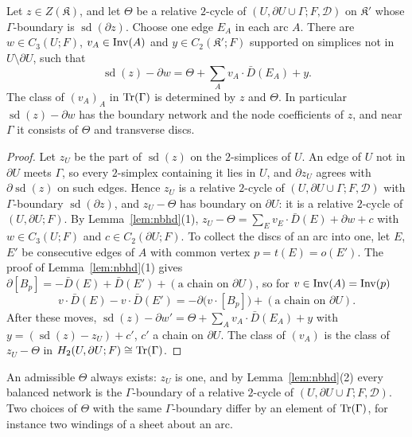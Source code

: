 \begin{lemma}\label{lem:normalform}
Let $z\in Z(\mathfrak K)$, and let $\Theta$ be a relative $2$-cycle of $(U,\partial U\cup\Gamma;F,\mathcal D)$ on $\mathfrak K'$
whose $\Gamma$-boundary is $\operatorname{sd}(\partial z)$. Choose one edge $E_A$ in each arc $A$. There are
$w\in C_3(U;F)$, $v_A\in\operatorname{Inv}(A)$ and $y\in C_2(\mathfrak K';F)$ supported on simplices not in $U\setminus\partial U$, such
that
\[
\operatorname{sd}(z)-\partial w=\Theta+\sum_Av_A\cdot\bar D(E_A)+y.
\]
The class of $(v_A)_A$ in $\mathrm{Tr}(\Gamma)$ is determined by $z$ and $\Theta$. In particular $\operatorname{sd}(z)-\partial w$ has the
boundary network and the node coefficients of $z$, and near $\Gamma$ it consists of $\Theta$ and transverse discs.
\end{lemma}

\begin{proof}
Let $z_U$ be the part of $\operatorname{sd}(z)$ on the $2$-simplices of $U$. An edge of $U$ not in $\partial U$ meets $\Gamma$,
so every $2$-simplex containing it lies in $U$, and $\partial z_U$ agrees with $\partial\operatorname{sd}(z)$ on such edges.
Hence $z_U$ is a relative $2$-cycle of $(U,\partial U\cup\Gamma;F,\mathcal D)$ with $\Gamma$-boundary
$\operatorname{sd}(\partial z)$, and $z_U-\Theta$ has boundary on $\partial U$: it is a relative $2$-cycle of $(U,\partial U;F)$.
By Lemma~\ref{lem:nbhd}(1), $z_U-\Theta=\sum_Ev_E\cdot\bar D(E)+\partial w+c$ with $w\in C_3(U;F)$ and $c\in C_2(\partial U;F)$.
To collect the discs of an arc into one, let $E$, $E'$ be consecutive edges of $A$ with common vertex $p=t(E)=o(E')$.
The proof of Lemma~\ref{lem:nbhd}(1) gives $\partial[B_p]=-\bar D(E)+\bar D(E')+(\text{a chain on }\partial U)$, so for
$v\in\operatorname{Inv}(A)=\operatorname{Inv}(p)$
\[
v\cdot\bar D(E)-v\cdot\bar D(E')=-\partial\bigl(v\cdot[B_p]\bigr)+(\text{a chain on }\partial U).
\]
After these moves, $\operatorname{sd}(z)-\partial w'=\Theta+\sum_Av_A\cdot\bar D(E_A)+y$ with $y=(\operatorname{sd}(z)-z_U)+c'$,
$c'$ a chain on $\partial U$. The class of $(v_A)$ is the class of $z_U-\Theta$ in $H_2(U,\partial U;F)\cong\mathrm{Tr}(\Gamma)$.
\end{proof}

An admissible $\Theta$ always exists: $z_U$ is one, and by Lemma~\ref{lem:nbhd}(2) every balanced network is the
$\Gamma$-boundary of a relative $2$-cycle of $(U,\partial U\cup\Gamma;F,\mathcal D)$. Two choices of $\Theta$ with the same
$\Gamma$-boundary differ by an element of $\mathrm{Tr}(\Gamma)$, for instance two windings of a sheet about an arc.

